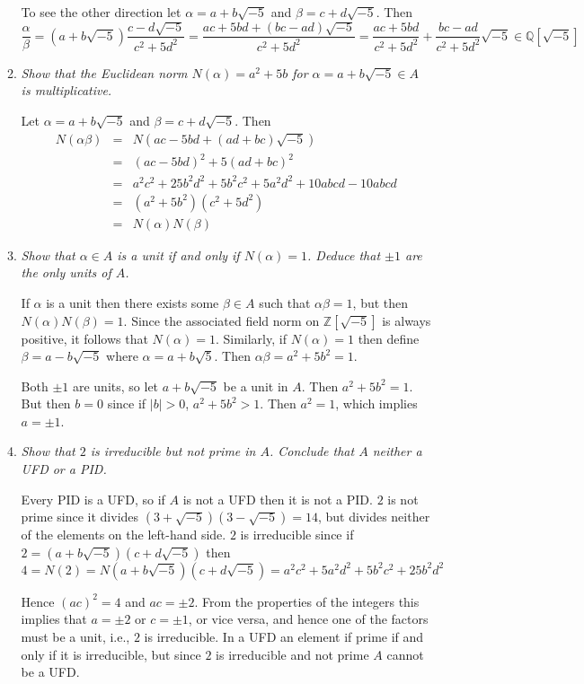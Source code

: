 \documentclass[10pt]{article}
\newcommand{\Z}{\mathbb{Z}}
\newcommand{\Q}{\mathbb{Q}}
\begin{document}
\begin{enumerate}
\begin{enumerate}
To see the other direction let $\alpha = a + b\sqrt{-5}$ and $\beta = c+d\sqrt{-5}$.  Then
\[
\frac{\alpha}{\beta} = (a + b\sqrt{-5})\frac{c-d\sqrt{-5}}{c^2 + 5d^2} = \frac{ac + 5bd + (bc - ad)\sqrt{-5}}{c^2 + 5d^2} = \frac{ac + 5bd}{c^2 + 5d^2} + \frac{bc - ad}{c^2 + 5d^2}\sqrt{-5} \in \Q[\sqrt{-5}]
\]

\item \emph{Show that the Euclidean norm $N(\alpha) = a^2 + 5b$ for $\alpha = a + b\sqrt{-5} \in A$ is multiplicative.}

Let $\alpha = a+b\sqrt{-5}$ and $\beta = c + d\sqrt{-5}$.  Then
\begin{eqnarray*}
N(\alpha\beta) &=& N(ac - 5bd + (ad + bc)\sqrt{-5}) \\
&=& (ac - 5bd)^2 + 5(ad + bc)^2 \\
&=& a^2c^2 + 25b^2d^2 + 5b^2c^2 + 5a^2d^2 + 10abcd - 10abcd \\
&=& (a^2 + 5b^2)(c^2+5d^2) \\
&=& N(\alpha)N(\beta)
\end{eqnarray*}
\item \emph{Show that $\alpha \in A$ is a unit if and only if $N(\alpha) = 1$.  Deduce that $\pm 1$ are the only units of $A$.}

If $\alpha$ is a unit then there exists some $\beta \in A$ such that $\alpha\beta = 1$, but then $N(\alpha)N(\beta) = 1$.  Since the associated field norm on $\Z[\sqrt{-5}]$ is always positive, it follows that $N(\alpha) = 1$.  Similarly, if $N(\alpha) = 1$ then define $\beta = a - b \sqrt{-5}$ where $\alpha = a + b \sqrt{5}$.  Then $\alpha \beta = a^2 + 5b^2 = 1$.

Both $\pm 1$ are units, so let $a + b\sqrt{-5}$ be a unit in $A$.  Then $a^2 + 5 b ^2 = 1$.  But then $b=0$ since if $|b| > 0$, $a^2 + 5b^2 > 1$.  Then $a^2 = 1$, which implies $a = \pm 1$.

\item \emph{Show that $2$ is irreducible but not prime in $A$.  Conclude that $A$ neither a UFD or a PID.}

Every PID is a UFD, so if $A$ is not a UFD then it is not a PID.  $2$ is not prime since it divides $(3+\sqrt{-5})(3-\sqrt{-5}) = 14$, but divides neither of the elements on the left-hand side.  $2$ is irreducible since if $2 = (a+b\sqrt{-5})(c+d\sqrt{-5})$ then
\[
4 = N(2) = N(a+b\sqrt{-5})(c+d\sqrt{-5}) = a^2c^2 + 5a^2d^2 + 5b^2c^2 + 25b^2d^2
\]

Hence $(ac)^2 = 4$ and $ac = \pm 2$.  From the properties of the integers this implies that $a = \pm 2$ or $c = \pm 1$, or vice versa, and hence one of the factors must be a unit, i.e., $2$ is irreducible.  In a UFD an element if prime if and only if it is irreducible, but since $2$ is irreducible and not prime $A$ cannot be a UFD.


\end{enumerate}
\end{enumerate}
\end{document}
